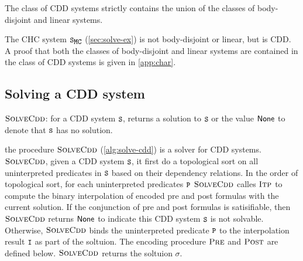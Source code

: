 \begin{thm}
	\label{thm:cdd-contains}
  The class of CDD systems strictly contains the union of the classes
  of body-disjoint and linear systems.
\end{thm}
%
The CHC system $\mcchc$ (\autoref{sec:solve-ex}) is not body-disjoint
or linear, but is CDD.
%
A proof that both the classes of body-disjoint and linear systems are
contained in the class of CDD systems is given in \autoref{app:char}.

\subsection{Solving a CDD system}
\label{sec:solve-cdd}

\begin{algorithm}[t]
  \caption{$\textsc{SolveCdd}$: for a CDD system $\cc{S}$, returns a
    solution to $\cc{S}$ or the value $\mathsf{None}$ to denote that
    $\cc{S}$ has no solution.}
  \label{alg:solve-cdd}
\end{algorithm}


the procedure $\textsc{SolveCdd}$ (\autoref{alg:solve-cdd}) is a solver for CDD systems.
%
$\textsc{SolveCdd}$, given a CDD system $\cc{S}$, it first do a topological sort on all
uninterpreted predicates in $\cc{S}$ based on their dependency relations.
%
In the order of topological sort, for each uninterpreted predicates $\cc{P}$ 
 $\textsc{SolveCdd}$ calles $\textsc{Itp}$ to compute the binary interpolation of 
 encoded pre and post formulas with the current solution.
 If the conjunction of pre and post formulas is satisifiable, then $\textsc{SolveCdd}$
 returns $\mathsf{None}$ to indicate this CDD system $\cc{S}$ is not solvable.
 Otherwise, $\textsc{SolveCdd}$ binds the uninterpreted predicate $\cc{P}$ to the
 interpolation result $\cc{I}$ as part of the soltuion.
 The encoding procedure $\textsc{Pre}$ and $\textsc{Post}$ are defined below.
 $\textsc{SolveCdd}$ returns the soltuion $\sigma$. 

